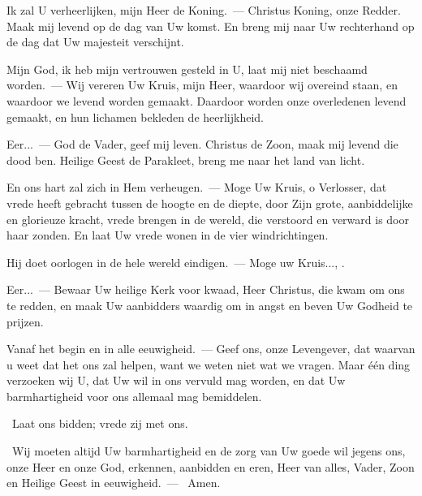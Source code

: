 \documentclass[12pt,twoside,a5paper]{article}
\begin{document}

\begin{halfparskip}
  Ik zal U verheerlijken, mijn Heer de Koning.~--- Christus Koning, onze Redder. Maak mij levend op de dag van Uw komst. En breng mij naar Uw rechterhand op de dag dat Uw majesteit verschijnt.

  Mijn God, ik heb mijn vertrouwen gesteld in U, laat mij niet beschaamd worden.~--- Wij vereren Uw Kruis, mijn Heer, waardoor wij overeind staan, en waardoor we levend worden gemaakt. Daardoor worden onze overledenen levend gemaakt, en hun lichamen bekleden de heerlijkheid.

  Eer...~--- God de Vader, geef mij leven. Christus de Zoon, maak mij levend die dood ben. Heilige Geest de Parakleet, breng me naar het land van licht.
\end{halfparskip}


\begin{halfparskip}
  En ons hart zal zich in Hem verheugen.~--- Moge Uw Kruis, o Verlosser, dat vrede heeft gebracht tussen de hoogte en de diepte, door Zijn grote, aanbiddelijke en glorieuze kracht, vrede brengen in de wereld, die verstoord en verward is door haar zonden. En laat Uw vrede wonen in de vier windrichtingen.

  Hij doet oorlogen in de hele wereld eindigen.~--- Moge uw Kruis..., .

  Eer...~--- Bewaar Uw heilige Kerk voor kwaad, Heer Christus, die kwam om ons te redden, en maak Uw aanbidders waardig om in angst en beven Uw Godheid te prijzen.

  Vanaf het begin en in alle eeuwigheid.~--- Geef ons, onze Levengever, dat waarvan u weet dat het ons zal helpen, want we weten niet wat we vragen. Maar één ding verzoeken wij U, dat Uw wil in ons vervuld mag worden, en dat Uw barmhartigheid voor ons allemaal mag bemiddelen.
\end{halfparskip}

\begin{halfparskip}
   \dd~Laat ons bidden; vrede zij met ons.

  \cc~Wij moeten altijd Uw barmhartigheid en de zorg van Uw goede wil jegens ons, onze Heer en onze God, erkennen, aanbidden en eren, Heer van alles, Vader, Zoon en Heilige Geest in eeuwigheid.~--- \rr~Amen.
\end{halfparskip}
\end{document}
